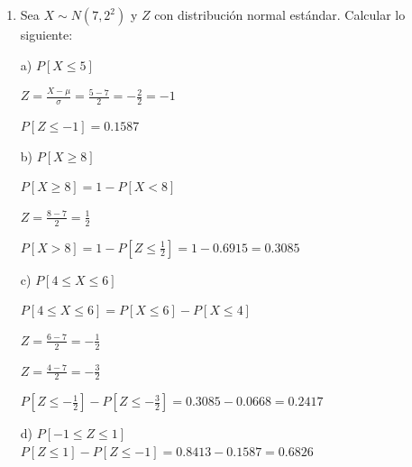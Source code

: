 \documentclass[a4paper, 12pt]{article}
\newcommand{\Aspace}{0.2cm}
\begin{document}
    \begin{enumerate}
        \item Sea $X \sim N(7, 2^{2})$ y $Z$ con distribución normal estándar. Calcular lo siguiente:
            \vspace{\Aspace} \par
            a) $P[X \leq 5]$
            \vspace{\Aspace}
            \\ { \color{azul} 
                \(
                    Z = \frac{X - \mu}{\sigma}
                    = \frac{5 - 7}{2}
                    = -\frac{2}{2}
                    = -1
                \) \par
                \( P[Z \leq -1] = 0{.}1587 \)
            }

            \vspace{\Aspace} \par
            b) $P[X \geq 8]$
            \vspace{\Aspace}
            \\ { \color{azul} 
                \( P[X \geq 8] = 1 - P[X < 8] \) \par
                \( Z = \frac{8 - 7}{2} = \frac{1}{2} \) \par
                \( P[X > 8] = 1 - P\left[Z \leq \frac{1}{2}\right] = 1 - 0{.}6915 = 0{.}3085 \)
            }

            \vspace{\Aspace} \par
            c) $P[4 \leq X \leq 6]$
            \vspace{\Aspace}
            \\ { \color{azul} 
                \( P[4 \leq X \leq 6] = P[X \leq 6] - P[X \leq 4] \) \par
                \( Z = \frac{6 - 7}{2} = -\frac{1}{2}\) \par
                \( Z = \frac{4 - 7}{2} = -\frac{3}{2}\) \par
                \( P[Z \leq -\frac{1}{2}] - P[Z \leq -\frac{3}{2}] = 0{.}3085 - 0{.}0668 = 0{.}2417\)
            }

            \vspace{\Aspace} \par
            d) $P[-1 \leq Z \leq 1]$
            \vspace{\Aspace}
            \\ { \color{azul} $P[Z \leq 1] - P[Z \leq -1] = 0{.}8413 - 0{.}1587 = 0{.}6826$ }


\end{enumerate}
\end{document}
